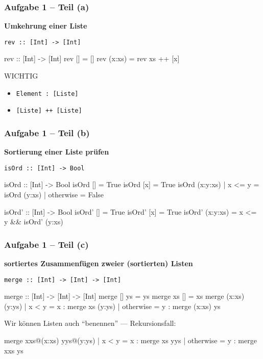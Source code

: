 \documentclass{beamer}
\begin{document}
\begin{frame}[t, fragile] \frametitle{Aufgabe 1 -- Teil (a)}
	\textbf{Umkehrung einer Liste}
	
	\texttt{rev :: [Int] -> [Int]}
	
	\pause \bigskip
	
	\begin{codebox}
rev :: [Int] -> [Int]
rev []     = []
rev (x:xs) = rev xs ++ [x]
	\end{codebox}

	\begin{alertblock}{WICHTIG}
		\begin{itemize}
			\item \texttt{Element : [Liste]}
			\item \texttt{[Liste] ++ [Liste]}
		\end{itemize}
	\end{alertblock}
\end{frame}


\begin{frame}[t, fragile] \frametitle{Aufgabe 1 -- Teil (b)}
	\small 
	\textbf{Sortierung einer Liste prüfen}
	
	\texttt{isOrd :: [Int] -> Bool}
	
	\pause \bigskip
	\begin{codebox}
isOrd :: [Int] -> Bool
isOrd []  = True
isOrd [x] = True
isOrd (x:y:xs)
	| x <= y    = isOrd (y:xs)
	| otherwise = False
	\end{codebox}
	\pause
	\begin{codebox}
isOrd' :: [Int] -> Bool
isOrd' []       = True
isOrd' [x]      = True
isOrd' (x:y:xs) = x <= y && isOrd' (y:xs)
	\end{codebox}
\end{frame}

\begin{frame}[t, fragile] \frametitle{Aufgabe 1 -- Teil (c)}
	\small
	\textbf{sortiertes Zusammenfügen zweier (sortierten) Listen}
	
	\texttt{merge :: [Int] -> [Int] -> [Int]}
	
	\pause \bigskip
	\begin{codebox}
merge :: [Int] -> [Int] -> [Int]
merge [] ys = ys
merge xs [] = xs
merge (x:xs) (y:ys)
	| x < y     = x : merge xs (y:ys)
	| otherwise = y : merge (x:xs) ys
	\end{codebox}
	\pause
	Wir können Listen auch ``benennen'' --- Rekursionsfall:
	\begin{codebox}
merge xxs@(x:xs) yys@(y:ys)
	| x < y     = x : merge xs yys
	| otherwise = y : merge xxs ys
	\end{codebox}
\end{frame}
\end{document}
